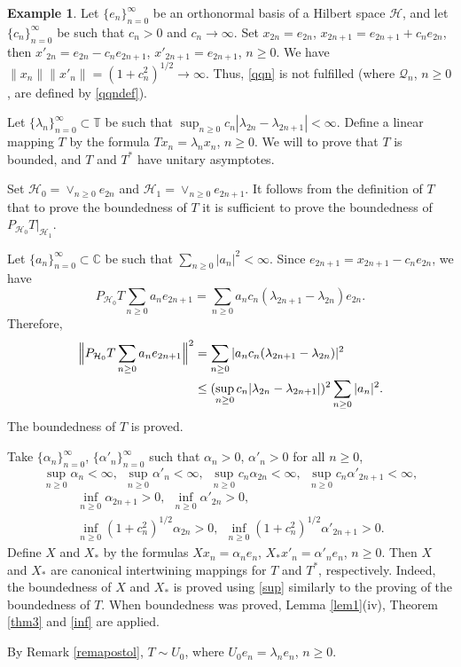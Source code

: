 \documentclass[a4paper,oneside,11pt]{amsart}
\numberwithin{equation}{section}
\theoremstyle{plain}
\theoremstyle{definition}
\newtheorem{example}[theorem]{Example}
\begin{document}
\begin{example}\label{exanoest}
 Let $\{e_n\}_{n=0}^\infty$ be an orthonormal basis of a Hilbert space $\mathcal H$, and let $\{c_n\}_{n=0}^\infty$ be such that 
 $c_n>0$ and $c_n\to\infty$. Set $x_{2n}=e_{2n}$, $x_{2n+1}=e_{2n+1}+c_ne_{2n}$, then $x'_{2n}=e_{2n}-c_n e_{2n+1}$,  
$x'_{2n+1}=e_{2n+1}$, $n\geq 0$. We have $\|x_n\|\|x'_n\|=(1+c_n^2)^{1/2}\to\infty$. Thus, \eqref{qqn} is not fulfilled (where $\mathcal Q_n$, $n\geq 0$,  are defined by \eqref{qqndef}). 

Let $\{\lambda_n\}_{n=0}^\infty\subset \mathbb T$ be such that 
$\sup_{n\geq 0}c_n|\lambda_{2n}-\lambda_{2n+1}|<\infty$. Define a linear mapping $T$ by the formula 
 $Tx_n=\lambda_nx_n$, $n\geq 0$. We will to prove that $T$ is bounded, and $T$ and $T^*$ have unitary asymptotes. 

Set $\mathcal H_0=\vee_{n\geq 0} e_{2n}$ and   $\mathcal H_1=\vee_{n\geq 0} e_{2n+1}$. It follows from the definition of $T$ 
 that to prove the boundedness of $T$ it is  sufficient to prove the boundedness of $P_{\mathcal H_0}T|_{\mathcal H_1}$. 

Let $\{a_n\}_{n=0}^\infty\subset \mathbb C$ be such that $\sum_{n\geq 0}|a_n|^2<\infty$. 
Since $e_{2n+1}=x_{2n+1}-c_ne_{2n}$, we have
$$ P_{\mathcal H_0}T\sum_{n\geq 0}a_ne_{2n+1}=\sum_{n\geq 0}a_nc_n(\lambda_{2n+1}-\lambda_{2n})e_{2n}. $$
Therefore,
 \begin{align*}\Bigl\|P_{\mathcal H_0}T\sum_{n\geq 0}a_ne_{2n+1}\Bigr\|^2&=\sum_{n\geq 0}|a_nc_n(\lambda_{2n+1}-\lambda_{2n})|^2\\&\leq
(\sup_{n\geq 0}c_n|\lambda_{2n}-\lambda_{2n+1}|)^2\sum_{n\geq 0}|a_n|^2.\end{align*} 
The boundedness of $T$ is proved. 

Take $\{\alpha_n\}_{n=0}^\infty$, $\{\alpha'_n\}_{n=0}^\infty$ such that $\alpha_n>0$, $\alpha'_n>0$ for all $n\geq 0$, 
\begin{equation}\label{sup} \sup_{n\geq 0}\alpha_n<\infty, \ \ \sup_{n\geq 0}\alpha'_n<\infty, \ \ \sup_{n\geq 0}c_n\alpha_{2n}<\infty,  
\ \ \sup_{n\geq 0}c_n\alpha'_{2n+1}<\infty,\end{equation}
\begin{equation}\label{inf}\begin{gathered}\inf_{n\geq 0}\alpha_{2n+1}>0,  \ \ \inf_{n\geq 0}\alpha'_{2n}>0,  \\
 \inf_{n\geq 0}(1+c_n^2)^{1/2}\alpha_{2n}>0, 
\ \ \inf_{n\geq 0}(1+c_n^2)^{1/2}\alpha'_{2n+1}>0.\end{gathered}\end{equation}
Define $X$ and $X_*$ by the formulas $Xx_n=\alpha_ne_n$, $X_*x'_n=\alpha'_ne_n$, $n\geq 0$. Then $X$ and $X_*$ are canonical intertwining mappings  
for $T$ and $T^*$, respectively. Indeed,  the boundedness of $X$ and $X_*$ is proved using \eqref{sup} 
similarly to the proving of the boundedness of $T$. When boundedness was proved,  Lemma \ref{lem1}(iv), Theorem \ref{thm3} and \eqref{inf} are applied.   

By Remark \ref{remapostol}, $T\sim U_0$, where $U_0e_n=\lambda_n e_n$, $n\geq 0$. 
\end{example}
\end{document}
